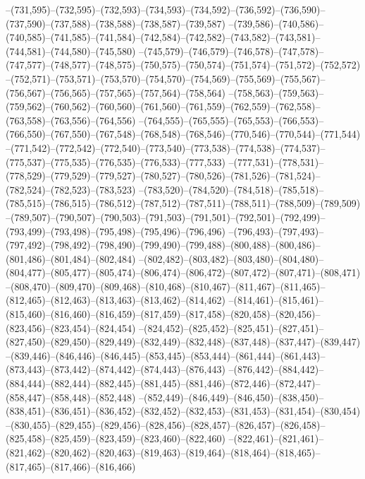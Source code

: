 --(731,595)--(732,595)--(732,593)--(734,593)--(734,592)--(736,592)--(736,590)--(737,590)--(737,588)--(738,588)--(738,587)--(739,587)
--(739,586)--(740,586)--(740,585)--(741,585)--(741,584)--(742,584)--(742,582)--(743,582)--(743,581)--(744,581)--(744,580)--(745,580)
--(745,579)--(746,579)--(746,578)--(747,578)--(747,577)--(748,577)--(748,575)--(750,575)--(750,574)--(751,574)--(751,572)--(752,572)
--(752,571)--(753,571)--(753,570)--(754,570)--(754,569)--(755,569)--(755,567)--(756,567)--(756,565)--(757,565)--(757,564)--(758,564)
--(758,563)--(759,563)--(759,562)--(760,562)--(760,560)--(761,560)--(761,559)--(762,559)--(762,558)--(763,558)--(763,556)--(764,556)
--(764,555)--(765,555)--(765,553)--(766,553)--(766,550)--(767,550)--(767,548)--(768,548)--(768,546)--(770,546)--(770,544)--(771,544)
--(771,542)--(772,542)--(772,540)--(773,540)--(773,538)--(774,538)--(774,537)--(775,537)--(775,535)--(776,535)--(776,533)--(777,533)
--(777,531)--(778,531)--(778,529)--(779,529)--(779,527)--(780,527)--(780,526)--(781,526)--(781,524)--(782,524)--(782,523)--(783,523)
--(783,520)--(784,520)--(784,518)--(785,518)--(785,515)--(786,515)--(786,512)--(787,512)--(787,511)--(788,511)--(788,509)--(789,509)
--(789,507)--(790,507)--(790,503)--(791,503)--(791,501)--(792,501)--(792,499)--(793,499)--(793,498)--(795,498)--(795,496)--(796,496)
--(796,493)--(797,493)--(797,492)--(798,492)--(798,490)--(799,490)--(799,488)--(800,488)--(800,486)--(801,486)--(801,484)--(802,484)
--(802,482)--(803,482)--(803,480)--(804,480)--(804,477)--(805,477)--(805,474)--(806,474)--(806,472)--(807,472)--(807,471)--(808,471)
--(808,470)--(809,470)--(809,468)--(810,468)--(810,467)--(811,467)--(811,465)--(812,465)--(812,463)--(813,463)--(813,462)--(814,462)
--(814,461)--(815,461)--(815,460)--(816,460)--(816,459)--(817,459)--(817,458)--(820,458)--(820,456)--(823,456)--(823,454)--(824,454)
--(824,452)--(825,452)--(825,451)--(827,451)--(827,450)--(829,450)--(829,449)--(832,449)--(832,448)--(837,448)--(837,447)--(839,447)
--(839,446)--(846,446)--(846,445)--(853,445)--(853,444)--(861,444)--(861,443)--(873,443)--(873,442)--(874,442)--(874,443)--(876,443)
--(876,442)--(884,442)--(884,444)--(882,444)--(882,445)--(881,445)--(881,446)--(872,446)--(872,447)--(858,447)--(858,448)--(852,448)
--(852,449)--(846,449)--(846,450)--(838,450)--(838,451)--(836,451)--(836,452)--(832,452)--(832,453)--(831,453)--(831,454)--(830,454)
--(830,455)--(829,455)--(829,456)--(828,456)--(828,457)--(826,457)--(826,458)--(825,458)--(825,459)--(823,459)--(823,460)--(822,460)
--(822,461)--(821,461)--(821,462)--(820,462)--(820,463)--(819,463)--(819,464)--(818,464)--(818,465)--(817,465)--(817,466)--(816,466)
